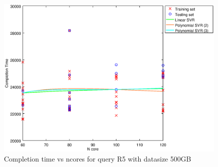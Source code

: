 
\begin {figure}[hbtp]
\centering
\includegraphics[width=\textwidth]{output/R5_500_ONLY_1_OVER_NCORES/plot_R5_500_bestmodels.eps}
\caption{Completion time vs ncores for query R5 with datasize 500GB}
\label{fig:all_nonlinear_R5_500}
\end {figure}
